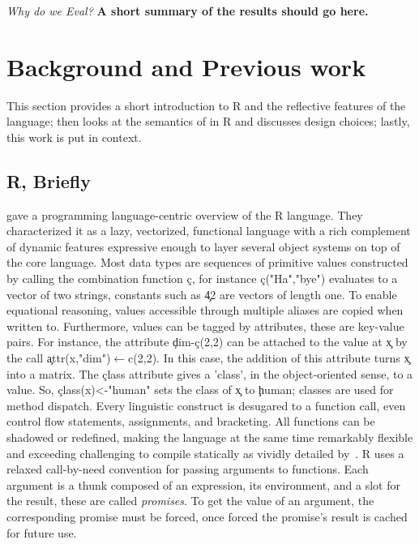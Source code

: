 \documentclass[screen,acmsmall]{acmart}
\begin{document}
\vspace{2mm}\noindent\emph{Why do we Eval?} {\bf A short summary of the
results should go here.}


\newpage
\section{Background and Previous work}

This section provides a short introduction to R and the reflective features of
the language; then looks at the semantics of \eval in R and discusses design
choices; lastly, this work is put in context.

\subsection{R, Briefly}

\citet{ecoop12} gave a programming language-centric overview of the R language.
They characterized it as a lazy, vectorized, functional language with a rich
complement of dynamic features expressive enough to layer several object systems
on top of the core language. Most data types are sequences of primitive values
constructed by calling the combination function \c{c}, for instance
\c{c("Ha","bye")} evaluates to a vector of two strings, constants such as \c{42}
are vectors of length one. To enable equational reasoning, values accessible
through multiple aliases are copied when written to. Furthermore, values can be
tagged by attributes, these are key-value pairs. For instance, the attribute
\c{dim}-\c{c(2,2)} can be attached to the value at \c{x} by the call
\c{attr(x,"dim")$\leftarrow$c(2,2)}. In this case, the addition of this
attribute turns \c x into a matrix. The \c{class} attribute gives a 'class', in
the object-oriented sense, to a value. So, \c{class(x)<-"human"} sets the class
of \c{x} to \c{human}; classes are used for method dispatch. Every linguistic
construct is desugared to a function call, even control flow statements,
assignments, and bracketing. All functions can be shadowed or redefined, making
the language at the same time remarkably flexible and exceeding challenging to
compile statically as vividly detailed by~\citet{dls19}. R uses a relaxed
call-by-need convention for passing arguments to functions. Each argument is a
thunk composed of an expression, its environment, and a slot for the result,
these are called \emph{promises}. To get the value of an argument, the
corresponding promise must be forced, once forced the promise's result is cached
for future use.
\end{document}
